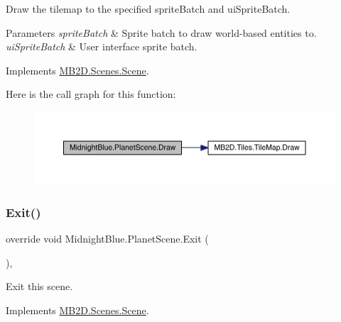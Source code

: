 Draw the tilemap to the specified sprite\+Batch and ui\+Sprite\+Batch. 


\begin{DoxyParams}{Parameters}
{\em sprite\+Batch} & Sprite batch to draw world-\/based entities to.\\
\hline
{\em ui\+Sprite\+Batch} & User interface sprite batch.\\
\hline
\end{DoxyParams}


Implements \hyperlink{class_m_b2_d_1_1_scenes_1_1_scene_a932d33071ecb4c5187367825dba72324}{M\+B2\+D.\+Scenes.\+Scene}.

Here is the call graph for this function\+:\nopagebreak
\begin{figure}[H]
\begin{center}
\leavevmode
\includegraphics[width=350pt]{class_midnight_blue_1_1_planet_scene_af22a201631e5f8c606ec3f7463635977_cgraph}
\end{center}
\end{figure}
\hypertarget{class_midnight_blue_1_1_planet_scene_af3aab90a13294493e1f2cd29b0fb60e6}{}\label{class_midnight_blue_1_1_planet_scene_af3aab90a13294493e1f2cd29b0fb60e6} 
\subsubsection{\texorpdfstring{Exit()}{Exit()}}
{\footnotesize\ttfamily override void Midnight\+Blue.\+Planet\+Scene.\+Exit (\begin{DoxyParamCaption}{ }\end{DoxyParamCaption})\hspace{0.3cm}{\ttfamily [inline]}, {\ttfamily [virtual]}}



Exit this scene. 



Implements \hyperlink{class_m_b2_d_1_1_scenes_1_1_scene_a099b79e16d23b67349847999d2336813}{M\+B2\+D.\+Scenes.\+Scene}.

